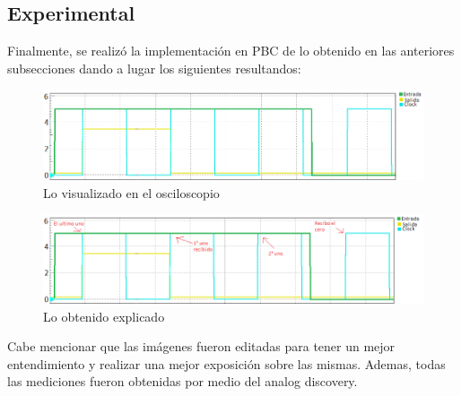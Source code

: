 \subsection{Experimental}
Finalmente, se realizó la implementación en PBC de lo obtenido en las anteriores subsecciones dando a lugar los siguientes resultandos:
\begin{figure}[H]
	\centering
	\includegraphics[scale=0.5]{Ejercicio2/Realidad.png}
	\caption{Lo visualizado en el osciloscopio}
\end{figure}
\begin{figure}[H]
	\centering
	\includegraphics[scale=0.5]{Ejercicio2/Realidad_explicada.png}
	\caption{Lo obtenido explicado}
\end{figure}
Cabe mencionar que las imágenes fueron editadas para tener un mejor entendimiento y realizar una mejor exposición sobre las mismas. Ademas, todas las mediciones fueron obtenidas por medio del analog discovery.
